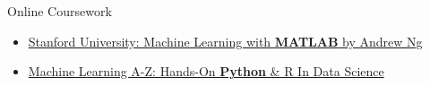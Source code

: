 \divider

{\large\color{emphasis}Online Coursework\par}
\smallskip
\begin{itemize}
\item \href{https://www.coursera.org/learn/machine-learning}{Stanford University: Machine Learning with \textbf{MATLAB} by Andrew Ng}
\item \href{https://www.udemy.com/machinelearning}{Machine Learning A-Z: Hands-On \textbf{Python} \& R In Data Science}
\end{itemize}


